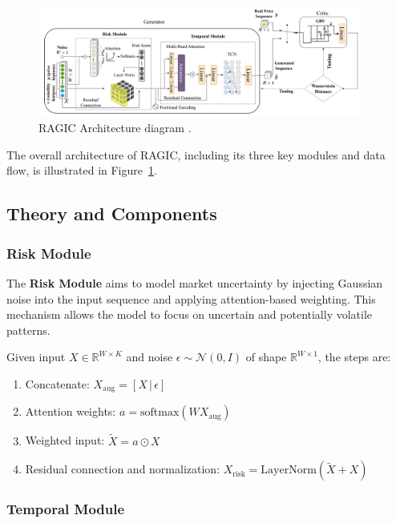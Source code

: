 \begin{figure}[H]
    \centering
    \includegraphics[width=0.95\textwidth]{Images/Screenshot 2025-05-19 at 15.00.48.png}
    \caption{RAGIC Architecture diagram \cite{gu_ragic_2025}.}
    \label{fig:ragic_architecture}
\end{figure}
The overall architecture of RAGIC, including its three key modules and data flow, is illustrated in Figure~\ref{fig:ragic_architecture}.

\subsection{Theory and Components}

\subsubsection{Risk Module}

The \textbf{Risk Module} aims to model market uncertainty by injecting Gaussian noise into the input sequence and applying attention-based weighting. This mechanism allows the model to focus on uncertain and potentially volatile patterns.

Given input $X \in \mathbb{R}^{W \times K}$ and noise $\epsilon \sim \mathcal{N}(0, I)$ of shape $\mathbb{R}^{W \times 1}$, the steps are:
\begin{enumerate}
    \item Concatenate: $X_{\text{aug}} = [X \, | \, \epsilon]$
    \item Attention weights: $a = \text{softmax}(WX_{\text{aug}})$
    \item Weighted input: $\tilde{X} = a \odot X$
    \item Residual connection and normalization: $X_{\text{risk}} = \text{LayerNorm}(\tilde{X} + X)$
\end{enumerate}

\subsubsection{Temporal Module}

